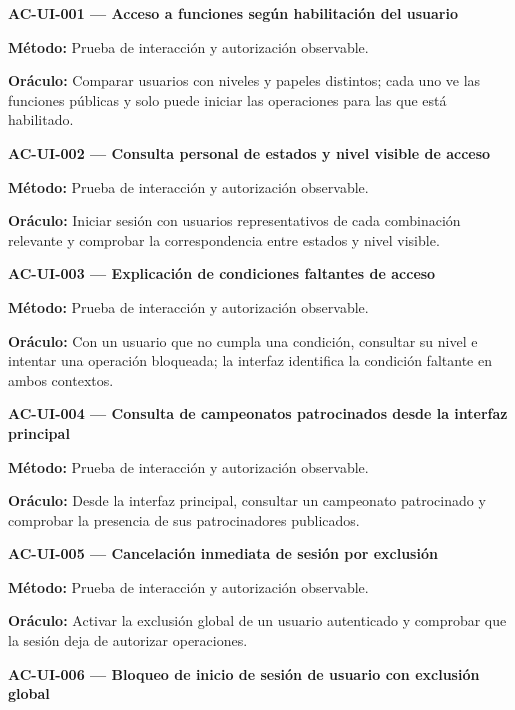 \documentclass[10pt,letterpaper]{article}
\begin{document}
\noindent\textbf{AC-UI-001 --- Acceso a funciones según habilitación del usuario}\par
\textbf{Método:} Prueba de interacción y autorización observable.\par
\textbf{Oráculo:} Comparar usuarios con niveles y papeles distintos; cada uno ve las funciones públicas y solo puede iniciar las operaciones para las que está habilitado.\par\vspace{0.45em}
\noindent\textbf{AC-UI-002 --- Consulta personal de estados y nivel visible de acceso}\par
\textbf{Método:} Prueba de interacción y autorización observable.\par
\textbf{Oráculo:} Iniciar sesión con usuarios representativos de cada combinación relevante y comprobar la correspondencia entre estados y nivel visible.\par\vspace{0.45em}
\noindent\textbf{AC-UI-003 --- Explicación de condiciones faltantes de acceso}\par
\textbf{Método:} Prueba de interacción y autorización observable.\par
\textbf{Oráculo:} Con un usuario que no cumpla una condición, consultar su nivel e intentar una operación bloqueada; la interfaz identifica la condición faltante en ambos contextos.\par\vspace{0.45em}
\noindent\textbf{AC-UI-004 --- Consulta de campeonatos patrocinados desde la interfaz principal}\par
\textbf{Método:} Prueba de interacción y autorización observable.\par
\textbf{Oráculo:} Desde la interfaz principal, consultar un campeonato patrocinado y comprobar la presencia de sus patrocinadores publicados.\par\vspace{0.45em}
\noindent\textbf{AC-UI-005 --- Cancelación inmediata de sesión por exclusión}\par
\textbf{Método:} Prueba de interacción y autorización observable.\par
\textbf{Oráculo:} Activar la exclusión global de un usuario autenticado y comprobar que la sesión deja de autorizar operaciones.\par\vspace{0.45em}
\noindent\textbf{AC-UI-006 --- Bloqueo de inicio de sesión de usuario con exclusión global}\par
\end{document}
